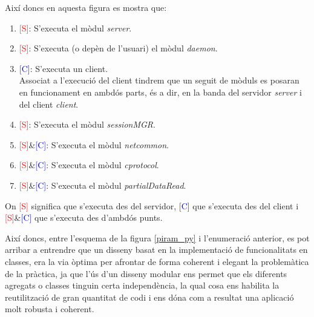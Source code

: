 \documentclass[a4paper,10pt]{article}
\begin{document}
 	Així doncs en aquesta figura es mostra que:
		\begin{enumerate}
		\item \textcolor{red}{[S]}: S'executa el mòdul \emph{server}.
		\item \textcolor{red}{[S]}: S'executa (o depèn de l'usuari) el mòdul \emph{daemon}.
		\item \textcolor{blue}{[C]}: S'executa un client.\\
		Associat a l'execució del client tindrem que un seguit de mòduls es posaran en funcionament en ambdós parts, és a dir, en la banda del servidor \emph{server} i del client \emph{client}.
		\item \textcolor{red}{[S]}: S'executa el mòdul \emph{sessionMGR}.
		\item \textcolor{red}{[S]}\&\textcolor{blue}{[C]}: S'executa el mòdul \emph{netcommon}.
		\item \textcolor{red}{[S]}\&\textcolor{blue}{[C]}: S'executa el mòdul \emph{cprotocol}.
		\item \textcolor{red}{[S]}\&\textcolor{blue}{[C]}: S'executa el mòdul \emph{partialDataRead}.
		\end{enumerate}
	On \textcolor{red}{[S]} significa que s'executa des del servidor, \textcolor{blue}{[C]} que s'executa des del client i \textcolor{red}{[S]}\&\textcolor{blue}{[C]} que s'executa des d'ambdós punts.

	Així doncs, entre l'esquema de la figura \ref{piram_py} i l'enumeració anterior, es pot arribar a entrendre que un disseny basat en la implementació de funcionalitats en classes, era la via òptima per afrontar de forma coherent i elegant la problemàtica de la pràctica, ja que l'ús d'un disseny modular ens permet que els diferents agregats o classes tinguin certa independència, la qual cosa ens habilita la reutilització de gran quantitat de codi i ens dóna com a resultat una aplicació molt robusta i coherent.
\end{document}

